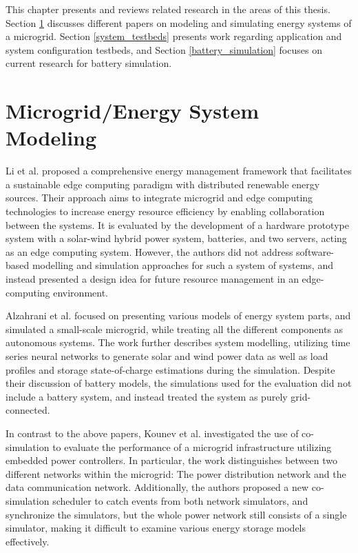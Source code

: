 This chapter presents and reviews related research in the areas of this thesis. Section \ref{microgrid_energy_system_modeling} discusses different papers on modeling and simulating energy systems of a microgrid. Section \ref{system_testbeds} presents work regarding application and system configuration testbeds, and Section \ref{battery_simulation} focuses on current research for battery simulation.

\section{Microgrid/Energy System Modeling} \label{microgrid_energy_system_modeling}

Li et al. \cite{SustainableEdgeComputing} proposed a comprehensive energy management framework that facilitates a sustainable edge computing paradigm with distributed renewable energy sources. Their approach aims to integrate microgrid and edge computing technologies to increase energy resource efficiency by enabling collaboration between the systems. It is evaluated by the development of a hardware prototype system with a solar-wind hybrid power system, batteries, and two servers, acting as an edge computing system. However, the authors did not address software-based modelling and simulation approaches for such a system of systems, and instead presented a design idea for future resource management in an edge-computing environment.

Alzahrani et al. \cite{alzahrani2017modeling} focused on presenting various models of energy system parts, and simulated a small-scale microgrid, while treating all the different components as autonomous systems. The work further describes system modelling, utilizing time series neural networks to generate solar and wind power data as well as load profiles and storage state-of-charge estimations during the simulation. Despite their discussion of battery models, the simulations used for the evaluation did not include a battery system, and instead treated the system as purely grid-connected.

In contrast to the above papers, Kounev et al. \cite{MicrogridCosim} investigated the use of co-simulation to evaluate the performance of a microgrid infrastructure utilizing embedded power controllers. In particular, the work distinguishes between two different networks within the microgrid: The power distribution network and the data communication network. Additionally, the authors proposed a new co-simulation scheduler to catch events from both network simulators, and synchronize the simulators, but the whole power network still consists of a single simulator, making it difficult to examine various energy storage models effectively.

